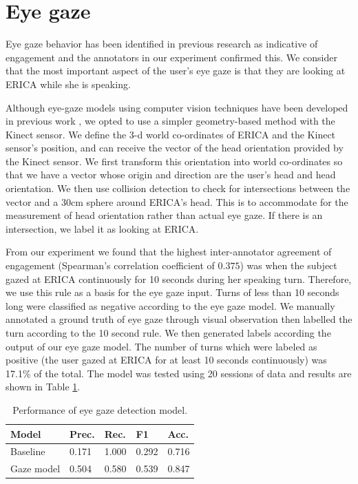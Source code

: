 \documentclass[letterpaper]{article} %
\begin{document}
\section{Eye gaze}
Eye gaze behavior has been identified in previous research as indicative of engagement \cite{Nakano2010,Rich2010} and the annotators in our experiment confirmed this. We consider that the most important aspect of the user's eye gaze is that they are looking at ERICA while she is speaking.

Although eye-gaze models using computer vision techniques have been developed in previous work \cite{Sewell2010,Zhang2015}, we opted to use a simpler geometry-based method with the Kinect sensor. We define the 3-d world co-ordinates of ERICA and the Kinect sensor's position, and can receive the vector of the head orientation provided by the Kinect sensor. We first transform this orientation into world co-ordinates so that we have a vector whose origin and direction are the user's head and head orientation. We then use collision detection to check for intersections between the vector and a 30cm sphere around ERICA's head. This is to accommodate for the measurement of head orientation rather than actual eye gaze. If there is an intersection, we label it as looking at ERICA.

From our experiment we found that the highest inter-annotator agreement of engagement (Spearman's correlation coefficient of $0.375$) was when the subject gazed at ERICA continuously for 10 seconds during her speaking turn. Therefore, we use this rule as a basis for the eye gaze input. Turns of less than 10 seconds long were classified as negative according to the eye gaze model. We manually annotated a ground truth of eye gaze through visual observation then labelled the turn according to the 10 second rule. We then generated labels according the output of our eye gaze model. The number of turns which were labeled as positive (the user gazed at ERICA for at least 10 seconds continuously) was 17.1\% of the total. The model was tested using 20 sessions of data and results are shown in Table \ref{gazeresults}.

\begin{table}[h]
\begin{center}
\begin{tabular}{|l|l|l|l|l|}
\hline \bf Model & \bf Prec. & \bf Rec. & \bf F1 & \bf Acc. \\ \hline
Baseline & 0.171 & 1.000 & 0.292 & 0.716 \\
Gaze model & 0.504 & 0.580 & 0.539 & 0.847 \\
\hline
\end{tabular}
\end{center}
\caption{\label{gazeresults} Performance of eye gaze detection model.}
\end{table}
\end{document}

